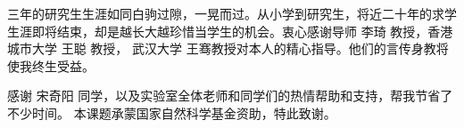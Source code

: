 \begin{acknowledgement}

  三年的研究生生涯如同白驹过隙，一晃而过。从小学到研究生，将近二十年的求学生涯即将结束，却是越长大越珍惜当学生的机会。衷心感谢导师 李琦 教授，香港城市大学 王聪 教授， 武汉大学 王骞教授对本人的精心指导。他们的言传身教将使我终生受益。

  感谢 宋奇阳 同学，以及实验室全体老师和同学们的热情帮助和支持，帮我节省了不少时间。
  本课题承蒙国家自然科学基金资助，特此致谢。

\end{acknowledgement}

